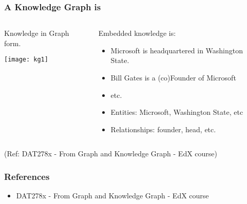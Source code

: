 \begin{frame}\frametitle{A Knowledge Graph is}


\begin{columns}
    \begin{column}[T]{0.6\linewidth}

		Knowledge in Graph form.

			\begin{center}
			\texttt{[image: kg1]}
			\end{center}	
    \end{column}
    \begin{column}[T]{0.4\linewidth}
			Embedded knowledge is:
			\begin{itemize}
			\item Microsoft is headquartered in Washington State.
			\item Bill Gates is a (co)Founder of Microsoft
			\item etc.
			\item Entities: Microsoft, Washington State, etc
			\item Relationships: founder, head, etc.
			\end{itemize}
    \end{column}
  \end{columns}
	

  

{\tiny (Ref: DAT278x - From Graph and Knowledge Graph - EdX course)}
\end{frame}

















\begin{frame}[fragile]\frametitle{References}

\begin{itemize}
\item DAT278x - From Graph and Knowledge Graph - EdX course
\end{itemize}
	  
\end{frame}

















